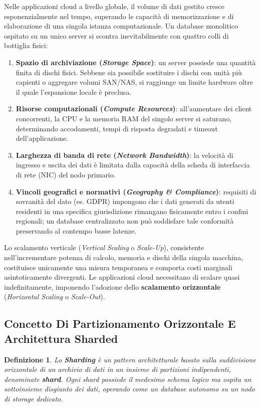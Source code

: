 \documentclass[11pt, a4paper]{article}
\newtheorem{theorem}{Definizione}
\begin{document}
Nelle applicazioni cloud a livello globale, il volume di dati gestito cresce esponenzialmente nel tempo, superando le capacità di memorizzazione e di elaborazione di una singola istanza computazionale. Un database monolitico ospitato su un unico server si scontra inevitabilmente con quattro colli di bottiglia fisici:
\begin{enumerate}
    \item \textbf{Spazio di archiviazione (\emph{Storage Space})}: un server possiede una quantità finita di dischi fisici. Sebbene sia possibile sostituire i dischi con unità più capienti o aggregare volumi SAN/NAS, si raggiunge un limite hardware oltre il quale l'espansione locale è preclusa.
    \item \textbf{Risorse computazionali (\emph{Compute Resources})}: all'aumentare dei client concorrenti, la CPU e la memoria RAM del singolo server si saturano, determinando accodamenti, tempi di risposta degradati e timeout dell'applicazione.
    \item \textbf{Larghezza di banda di rete (\emph{Network Bandwidth})}: la velocità di ingresso e uscita dei dati è limitata dalla capacità della scheda di interfaccia di rete (NIC) del nodo primario.
    \item \textbf{Vincoli geografici e normativi (\emph{Geography \& Compliance})}: requisiti di sovranità del dato (es. GDPR) impongono che i dati generati da utenti residenti in una specifica giurisdizione rimangano fisicamente entro i confini regionali; un database centralizzato non può soddisfare tale conformità preservando al contempo basse latenze.
\end{enumerate}

Lo scalamento verticale (\emph{Vertical Scaling} o \emph{Scale-Up}), consistente nell'incrementare potenza di calcolo, memoria e dischi della singola macchina, costituisce unicamente una misura temporanea e comporta costi marginali asintoticamente divergenti. Le applicazioni cloud necessitano di scalare quasi indefinitamente, imponendo l'adozione dello \textbf{scalamento orizzontale} (\emph{Horizontal Scaling} o \emph{Scale-Out}).

\subsection{Concetto Di Partizionamento Orizzontale E Architettura Sharded}

\begin{theorem}
Lo \textbf{Sharding} è un pattern architetturale basato sulla suddivisione orizzontale di un archivio di dati in un insieme di partizioni indipendenti, denominate \textbf{shard}. Ogni shard possiede il medesimo schema logico ma ospita un sottoinsieme disgiunto dei dati, operando come un database autonomo su un nodo di storage dedicato.
\end{theorem}
\end{document}
